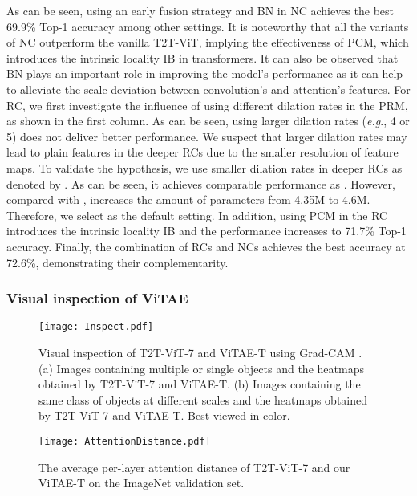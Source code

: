 \documentclass[twocolumn]{svjour3}          \smartqed  \usepackage{natbib}
\newcommand{\eg}{e.g}
\def\onedot{.\xspace}
\def\eg{\emph{e.g}\onedot}
\begin{document}
\begin{table}
\end{table}As can be seen, using an early fusion strategy and BN in NC achieves the best 69.9\% Top-1 accuracy among other settings. It is noteworthy that all the variants of NC outperform the vanilla T2T-ViT, implying the effectiveness of PCM, which introduces the intrinsic locality IB in transformers. It can also be observed that BN plays an important role in improving the model's performance as it can help to alleviate the scale deviation between convolution's and attention's features. For RC, we first investigate the influence of using different dilation rates in the PRM, as shown in the first column. As can be seen, using larger dilation rates (\eg, 4 or 5) does not deliver better performance. We suspect that larger dilation rates may lead to plain features in the deeper RCs due to the smaller resolution of feature maps. To validate the hypothesis, we use smaller dilation rates in deeper RCs as denoted by . As can be seen, it achieves comparable performance as . However, compared with ,  increases the amount of parameters from 4.35M to 4.6M. Therefore, we select  as the default setting. In addition, using PCM in the RC introduces the intrinsic locality IB and the performance increases to 71.7\% Top-1 accuracy. Finally, the combination of RCs and NCs achieves the best accuracy at 72.6\%, demonstrating their complementarity.

\subsubsection{Visual inspection of ViTAE}

\begin{figure*}
    \centering
    \texttt{[image: Inspect.pdf]}
    \caption{Visual inspection of T2T-ViT-7 and ViTAE-T using Grad-CAM \citep{selvaraju2017grad}. (a) Images containing multiple or single objects and the heatmaps obtained by T2T-ViT-7 and ViTAE-T. (b) Images containing the same class of objects at different scales and the heatmaps obtained by T2T-ViT-7 and ViTAE-T. Best viewed in color.}
    \label{fig:visualInspect}
\end{figure*}


\begin{figure}
    \texttt{[image: AttentionDistance.pdf]}
    \caption{The average per-layer attention distance of T2T-ViT-7 and our ViTAE-T on the ImageNet validation set.}
    \label{fig:attentionDistance}
\end{figure}
\end{document}
